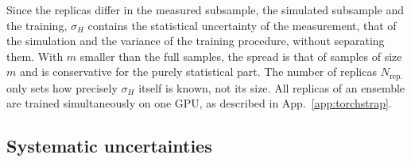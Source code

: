  Since the replicas differ in the measured subsample, the simulated subsample and the training, \(\sigma_H\) contains the statistical uncertainty of the measurement, that of the simulation and the variance of the training procedure, without separating them. 
 With \(m\) smaller than the full samples, the spread is that of samples of size \(m\) and is conservative for the purely statistical part. 
 The number of replicas \(N_\mathrm{rep.}\) only sets how precisely \(\sigma_H\) itself is known, not its size.
 All replicas of an ensemble are trained simultaneously on one GPU, as described in App.~\ref{app:torchstrap}.
 
 \subsection{Systematic uncertainties}
 \label{sec:ppSystematics}
